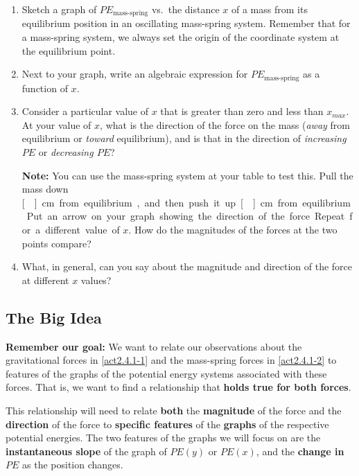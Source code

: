 \begin{enumerate}
	\item Sketch a graph of $PE_\text{mass-spring}$ vs.\ the distance $x$ of a mass from its equilibrium position in an oscillating mass-spring system. Remember that for a mass-spring system, we always set the origin of the coordinate system at the equilibrium point.
	
	\item Next to your graph, write an algebraic expression for $PE_\text{mass-spring}$ as a function of $x$.
	
	\item Consider a particular value of $x$ that is greater than zero and less than $x_{max}$. At your value of $x$, what is the direction of the force on the mass (\emph{away} from equilibrium or \emph{toward} equilibrium), and is that in the direction of \emph{increasing $PE$} or \emph{decreasing $PE$}?
	
		\textbf{Note:} You can use the mass-spring system at your table to test this. Pull the mass down \unit[]{cm} from equilibrium, and then push it up \unit[]{cm} from equilibrium.
		
		Put an arrow on your graph showing the direction of the force. Repeat for a different value of $x$. How do the magnitudes of the forces at the two points compare?
	
	\item What, in general, can you say about the magnitude and direction of the force at different $x$ values?
\end{enumerate}

\subsection{The Big Idea}

\begin{overview}

\textbf{Remember our goal:} We want to relate our observations about the gravitational forces in \ref{act2.4.1-1} and the mass-spring forces in \ref{act2.4.1-2} to features of the graphs of the potential energy systems associated with these forces. That is, we want to find a relationship that \textbf{holds true for both forces}.
	
\end{overview}

\noindent This relationship will need to relate \textbf{both} the \textbf{magnitude} of the force and the \textbf{direction} of the force to \textbf{specific features} of the \textbf{graphs} of the respective potential energies. The two features of the graphs we will focus on are the \textbf{instantaneous slope} of the graph of $PE(y)$ or $PE(x)$, and the \textbf{change in $PE$} as the position changes.

